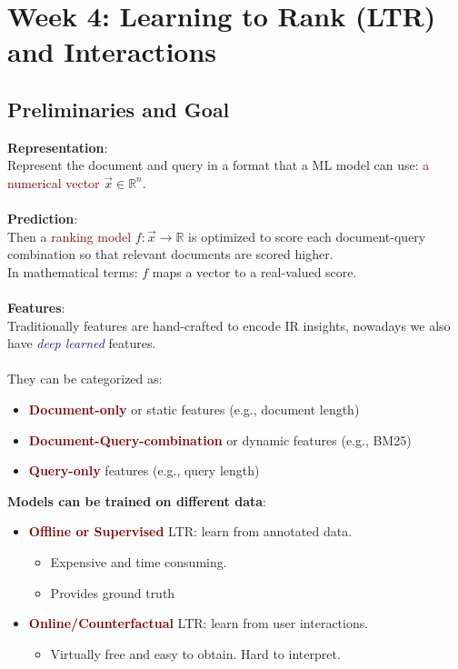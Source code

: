 \section{Week 4: Learning to Rank (LTR) and Interactions}

\subsection{Preliminaries and Goal} 

\textbf{Representation}: \\
Represent the document and query in a format that a ML model can use: \textcolor{Maroon}{a numerical vector} $\vec{x} \in \mathbb{R}^{n}$.\\
\\
\textbf{Prediction}: \\
Then a \textcolor{Maroon}{ranking model} $f : \vec{x} \rightarrow \mathbb{R}$ is optimized to score each document-query combination so that relevant documents are scored higher. \\
In mathematical terms: $f$ maps a vector to a real-valued score. \\
\\
\textbf{Features}: \\
Traditionally features are hand-crafted to encode IR insights, nowadays we also have \textit{\textcolor{MidnightBlue}{deep learned}} features. \\
\\
They can be categorized as: 
\begin{itemize}
    \setlength\itemsep{0em}
    \item \textbf{\textcolor{Maroon}{Document-only}} or static features (e.g., document length)
    \item \textbf{\textcolor{Maroon}{Document-Query-combination}} or dynamic features (e.g., BM25)
    \item \textbf{\textcolor{Maroon}{Query-only}} features (e.g., query length)
\end{itemize}

\newpage
\textbf{Models can be trained on different data}:
\begin{itemize}
    \setlength\itemsep{0em}
    \item \textbf{\textcolor{Maroon}{Offline or Supervised}} LTR: learn from annotated data.
    \begin{itemize}
    \setlength\itemsep{0em}
        \item Expensive and time consuming.
        \item Provides ground truth
    \end{itemize}
    \item \textbf{\textcolor{Maroon}{Online/Counterfactual}} LTR: learn from user interactions.
    \begin{itemize}
    \setlength\itemsep{0em}
        \item Virtually free and easy to obtain.
        Hard to interpret.
    \end{itemize}
\end{itemize}

